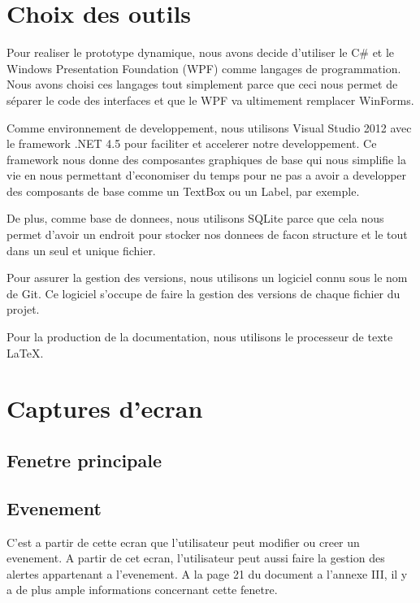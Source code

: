 \documentclass[letterpaper, oneside, 12pt, these, creativecommons]{thETS}
\begin{document}
\section{Choix des outils}

Pour realiser le prototype dynamique, nous avons decide d'utiliser le C\# et le Windows Presentation Foundation (WPF) comme langages de programmation. Nous avons choisi ces langages tout simplement parce que ceci nous permet de séparer le code des interfaces et que le WPF va ultimement remplacer WinForms. 

Comme environnement de developpement, nous utilisons Visual Studio 2012 avec le framework .NET 4.5 pour faciliter et accelerer notre developpement. Ce framework nous donne des composantes graphiques de base qui nous simplifie la vie en nous permettant d'economiser du temps pour ne pas a avoir a developper des composants de base comme un TextBox ou un Label, par exemple.

De plus, comme base de donnees, nous utilisons SQLite parce que cela nous permet d'avoir un endroit pour stocker nos donnees de facon structure et le tout dans un seul et unique fichier.

Pour assurer la gestion des versions, nous utilisons un logiciel connu sous le nom de Git. Ce logiciel s'occupe de faire la gestion des versions de chaque fichier du projet.

Pour la production de la documentation, nous utilisons le processeur de texte \LaTeX.

\newpage

\section{Captures d'ecran}

\subsection{Fenetre principale}

\newpage

\subsection{Evenement}

C'est a partir de cette ecran que l'utilisateur peut modifier ou creer un evenement. A partir de cet ecran, l'utilisateur peut aussi faire la gestion des alertes appartenant a l'evenement. A la page 21 du document a l'annexe III, il y a de plus ample informations concernant cette fenetre.
\end{document}
